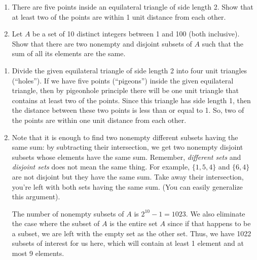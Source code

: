 \documentclass{article}
\theoremstyle{definition}
\begin{document}
\begin{question}
    \begin{enumerate}
	\item There are five points inside an equilateral triangle of side length 2. 
	Show that at least two of the points are within 1 unit distance from each other.
	\item Let $A$ be a set of 10 distinct integers between 1 and 100 (both inclusive). 
	Show that there are two nonempty and disjoint subsets of $A$ such that the sum of all its elements are the same.
    \end{enumerate}
\end{question}
\begin{solution}
\begin{enumerate}
	\item 	
	Divide the given equilateral triangle of side length 2 into four unit triangles (``holes'').  If we have five points (``pigeons'') inside the given equilateral triangle, then by pigeonhole principle there will be one unit triangle that contains at least two of the points.  Since this triangle has side length 1, then the distance between these two points is less than or equal to 1.  So, two of the points are within one unit distance from each other.
		{\color{red}
		\begin{center}
	\end{center}}


	\item Note that it is enough to find two nonempty different subsets having the same sum: by subtracting their intersection, we get two nonempty disjoint subsets whose elements have the same sum. Remember, \textit{different sets} and \textit{disjoint sets } does not mean the same thing. For example, $\{1,5,4\}$ and $\{6,4\}$ are not disjoint but they have the same sum. Take away their intersection, you're left with both sets having the same sum. (You can easily generalize this argument). 
	
	
	The number of nonempty subsets of $A$ is $2^{10}-1 = 1023$. We also eliminate the case where the subset of $A$ is the entire set $A$ since if that happens to be a subset, we are left with the empty set as the other set. Thus, we have 1022 subsets of interest for us here, which will contain at least 1 element and at most 9 elements.
	

\end{enumerate}
\end{solution}
\end{document}
